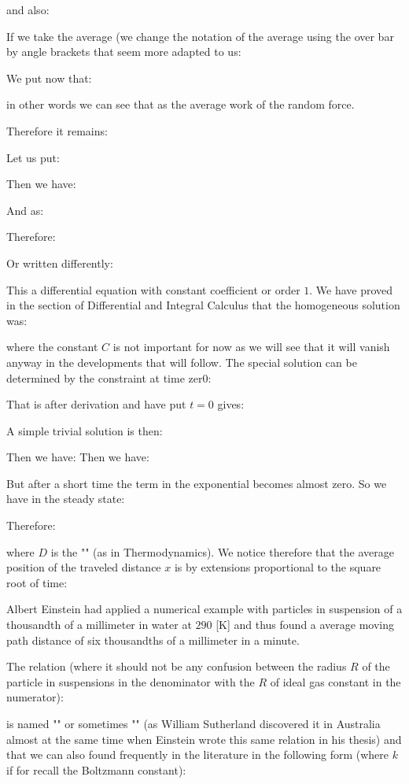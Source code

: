 	and also:
	
	If we take the average (we change the notation of the average using the over bar by angle brackets that seem more adapted to us:
	
	We put now that:
	
	in other words we can see that as the average work of the random force.

	Therefore it remains:
	
	Let us put:
	
	Then we have:
	
	And as:
	
	Therefore:
	
	Or written differently:
	
	This a differential equation with constant coefficient or order $1$. We have proved in the section of Differential and Integral Calculus that the homogeneous solution was:
	
	where the constant $C$ is not important for now as we will see that it will vanish anyway in the developments that will follow. The special solution can be determined by the constraint at time zer0:
	
	That is after derivation and have put $t=0$ gives:
	
	A simple trivial solution is then:
	
	Then we have:
	Then we have:
	
	But after a short time the term in the exponential becomes almost zero. So we have in the steady state:
	
	Therefore:
	
	where $D$ is the "" (as in Thermodynamics). We notice therefore that the average position of the traveled distance $x$ is by extensions proportional to the square root of time:
	
	Albert Einstein had applied a numerical example with particles in suspension of a thousandth of a millimeter in water at $290$ [K] and thus found a average moving path distance of six thousandths of a millimeter in a minute.
	
	The relation (where it should not be any confusion between the radius $R$ of the particle in suspensions in the denominator with the $R$ of ideal gas constant in the numerator):
	
	is named "" or sometimes "" (as William Sutherland discovered it in Australia almost at the same time when Einstein wrote this same relation in his thesis) and that we can also found frequently in the literature in the following form (where $k$ if for recall the Boltzmann constant):
	
